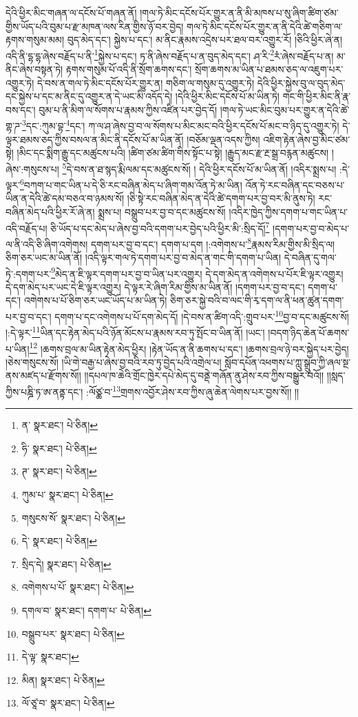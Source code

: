 དེའི་ཕྱིར་མིང་གཞན་ལ་དངོས་པོ་གཞན་ནོ། །གལ་ཏེ་མིང་དངོས་པོར་གྱུར་ན་ནི་མི་མཁས་པ་སུ་ཞིག་ཚིག་ཙམ་གྱིས་ཡོད་པའི་བུམ་པ་རྫ་མཁན་ལས་རིན་གྱིས་ཉོ་བར་བྱེད། གལ་ཏེ་མིང་དངོས་པོར་གྱུར་ན་ནི་དེའི་ཚེ་གཅིག་ལ་རྟགས་གསུམ་མམ། བུད་མེད་དང་། སྐྱེས་པ་དང་། མ་ནིང་རྣམས་འདྲེས་པར་ཐལ་བར་འགྱུར་རོ། །ཅིའི་ཕྱིར་ཞེ་ན། འདི་ནི་དྷ་དྷ་ཞེས་བརྗོད་པ་ནི་\footnote{ན་  སྣར་ཐང་།  པེ་ཅིན། }སྐྱེས་པ་དང་། ཏ་ནི་ཞེས་བརྗོད་པ་ན་བུད་མེད་དང་། ཤ་རི་\footnote{ཧི་  སྣར་ཐང་།  པེ་ཅིན། }རཾ་ཞེས་བརྗོད་པ་ན། མ་ནིང་ཞེས་བསྟན་ཏེ། རྟགས་གསུམ་པོ་འདི་ནི་སྲོག་ཆགས་དང་། སྲོག་ཆགས་མ་ཡིན་པ་ཐམས་ཅད་ལ་འཇུག་པར་འགྱུར་ཏེ། དེ་བས་ན་གལ་ཏེ་མིང་དངོས་པོར་གྱུར་ན། གཅིག་ལ་གསུམ་དུ་འགྱུར་ཏེ། དེའི་ཕྱིར་སྐྱེས་བུ་ལ་བུད་མེད་དང་སྐྱེས་པ་དང་མ་ནིང་དུ་འགྱུར་ན་དེ་ཡང་མི་འདོད་དེ། །དེའི་ཕྱིར་མིང་དངོས་པོ་མ་ཡིན་ཏེ། གང་གི་ཕྱིར་མིང་ནི་རྣ་བས་དང་། བུམ་པ་ནི་མིག་ལ་སོགས་པ་རྣམས་ཀྱིས་འཛིན་པར་བྱེད་དོ། །གལ་ཏེ་ཡང་མིང་བུམ་པར་གྱུར་ན་དེའི་ཚེ་གྷ་ཌ་\footnote{ཊ་  སྣར་ཐང་།  པེ་ཅིན། }དང་:ཀུམ་བྷ་\footnote{ཀུམ་པ་  སྣར་ཐང་།  པེ་ཅིན། }དང་། ཀ་ལ་ཤ་ཞེས་བྱ་བ་ལ་སོགས་པ་མིང་མང་བའི་ཕྱིར་དངོས་པོ་མང་བ་ཉིད་དུ་འགྱུར་ཏེ། དེ་ལྟར་ཐམས་ཅད་ཀྱིས་བསལ་ན་མིང་ནི་དངོས་པོ་མ་ཡིན་ནོ། །བཅོམ་ལྡན་འདས་ཀྱིས། འཇིག་རྟེན་ཞེས་བྱ་མིང་ཙམ་སྟེ། །མིང་དང་སྨིག་རྒྱུ་དང་མཚུངས་པའི། །ཚིག་ཙམ་ཚིག་གིས་སྟོང་པ་སྟེ། །རྒྱུད་མང་རྫ་རྔ་སྒྲ་བརྙན་མཚུངས། །ཞེས་:གསུངས་པ། \footnote{གསུངས་སོ་  སྣར་ཐང་།  པེ་ཅིན། }དེ་བས་ན་ཐ་སྙད་རྨི་ལམ་དང་མཚུངས་སོ། །
དེའི་ཕྱིར་དངོས་པོ་མ་ཡིན་ནོ། །འདིར་སྨྲས་པ། :དེ་ལྟར་\footnote{དེ་  སྣར་ཐང་།  པེ་ཅིན། }བཀག་པ་གང་ཡིན་པ་དེ་ཅི་རང་བཞིན་མེད་པ་ཞིག་གམ་འོན་ཏེ་མ་ཡིན། འོན་ཏེ་རང་བཞིན་དང་བཅས་པ་ཡིན་ན་དེའི་ཚེ་དམ་བཅའ་བ་ཉམས་སོ། །ཅི་སྟེ་རང་བཞིན་མེད་ན་དེའི་ཚེ་དགག་པར་བྱ་བར་མི་ནུས་ཏེ། རང་བཞིན་མེད་པའི་ཕྱིར་རོ་ཞེ་ན། སྨྲས་པ། བསྒྲུབ་པར་བྱ་བ་དང་མཚུངས་སོ། །འདིར་ཁྱེད་ཀྱིས་དགག་པ་གང་ཡིན་པ་འདི་བརྗོད་པ། ཅི་ཡོད་པ་དང་མེད་པ་ཞེས་བྱ་བའི་དགག་པར་བྱེད་པའི་ཕྱིར་མི་:སྲིད་དོ།\footnote{སྲིད་དེ།  སྣར་ཐང་།  པེ་ཅིན། } །དགག་པར་བྱ་བ་མེད་པ་ལ་ནི་འདི་ཅི་ཞིག་འགེགས། དགག་པར་བྱ་བ་དང་། དགག་པ་དག །:འགེགས་པ་\footnote{འགེགས་པ་པོ་  སྣར་ཐང་།  པེ་ཅིན། }རྣམས་རིམ་གྱིས་མི་སྲིད་ལ། ཅིག་ཅར་ཡང་མ་ཡིན་ནོ། །འདི་ལྟར་གལ་ཏེ་དགག་པར་བྱ་བ་མེད་ན་གང་གི་དགག་པ་ཡིན། དེ་བཞིན་དུ་གལ་ཏེ་:དགག་པར་\footnote{དགལ་བ་  སྣར་ཐང་། དགག་པ་  པེ་ཅིན། }མེད་ན་ཇི་ལྟར་དགག་པར་བྱ་བ་ཡིན་པར་འགྱུར། དེ་དག་མེད་ན་འགེགས་པ་པོར་ཇི་ལྟར་འགྱུར། དེ་དག་མེད་པར་ཡང་དེ་ཇི་ལྟར་འགྱུར། དེ་ལྟར་རེ་ཞིག་རིམ་གྱིས་མ་ཡིན་ནོ། །དགག་པར་བྱ་བ་དང་། དགག་པ་དང་། འགེགས་པ་པོ་ཅིག་ཅར་ཡང་ཡོད་པ་མ་ཡིན་ཏེ། ཅིག་ཅར་སྐྱེ་བའི་བ་ལང་གི་རྭ་དག་ལ་ནི་ཕན་ཚུན་དགག་པར་བྱ་བ་དང་། དགག་པ་དང་འགེགས་པ་པོ་དག་མེད་དོ། །དེ་བས་ན་ཚིག་འདི་:གྲུབ་པར་\footnote{བསྒྲུབ་པར་  སྣར་ཐང་།  པེ་ཅིན། }བྱ་བ་དང་མཚུངས་སོ། །:དེ་ལྟར་\footnote{དེ་ལྟ་  སྣར་ཐང་། }ཡིན་དང་རྟེན་མེད་པའི་ཉོན་མོངས་པ་རྣམས་རབ་ཏུ་སྤོང་བ་ཡིན་ནོ། །ཡང་། །བདག་ཉིད་ཆེན་པོ་ཆགས་པ་ཡིན།\footnote{མིན།  སྣར་ཐང་།  པེ་ཅིན། } །ཆགས་བྲལ་མ་ཡིན་རྟེན་མེད་ཕྱིར། །རྟེན་ཡོད་ན་ནི་ཆགས་པ་དང་། །ཆགས་བྲལ་ཉེ་བར་སྐྱེད་པར་བྱེད། །ཅེས་གསུངས་སོ། །ཡི་གེ་བརྒྱ་པ་ཞེས་བྱ་བའི་རབ་ཏུ་བྱེད་པའི་འགྲེལ་པ། སློབ་དཔོན་འཕགས་པ་ཀླུ་སྒྲུབ་ཀྱི་ཞལ་སྔ་ནས་མཛད་པ་རྫོགས་སོ།། །།དཔལ་ཁ་ཆེའི་གྲོང་ཁྱེར་དཔེ་མེད་དུ་བནྡེ་གཞོན་ནུ་ཤེས་རབ་ཀྱིས་བསྒྱུར་བའོ།། །།སླད་ཀྱིས་པཎྜི་ཏ་ཨ་ནནྟ་དང་། :ལོཙྪ་བ་\footnote{ལོ་ཙཱ་བ་  སྣར་ཐང་།  པེ་ཅིན། }གྲགས་འབྱོར་ཤེས་རབ་ཀྱིས་ཞུ་ཆེན་ལེགས་པར་བྱས་སོ།། །།